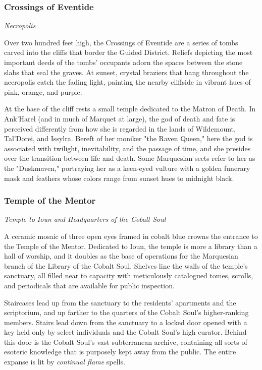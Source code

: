 \documentclass[10pt,a4paper,twoside,bg=print,twocolumn,openany,nodeprecatedcode]{dndbook}
\begin{document}
\subsubsection{Crossings of Eventide}
\textit{Necropolis}

Over two hundred feet high, the Crossings of Eventide are a series of tombs carved into the cliffs that border the Guided District. Reliefs depicting the most important deeds of the tombs' occupants adorn the spaces between the stone slabs that seal the graves. At sunset, crystal braziers that hang throughout the necropolis catch the fading light, painting the nearby cliffside in vibrant hues of pink, orange, and purple.

At the base of the cliff rests a small temple dedicated to the Matron of Death. In Ank'Harel (and in much of Marquet at large), the god of death and fate is perceived differently from how she is regarded in the lands of Wildemount, Tal'Dorei, and Issylra. Bereft of her moniker "the Raven Queen," here the god is associated with twilight, inevitability, and the passage of time, and she presides over the transition between life and death. Some Marquesian sects refer to her as the "Duskmaven," portraying her as a keen-eyed vulture with a golden funerary mask and feathers whose colors range from sunset hues to midnight black.

\subsubsection{Temple of the Mentor}
\textit{Temple to Ioun and Headquarters of the Cobalt Soul}

A ceramic mosaic of three open eyes framed in cobalt blue crowns the entrance to the Temple of the Mentor. Dedicated to Ioun, the temple is more a library than a hall of worship, and it doubles as the base of operations for the Marquesian branch of the Library of the Cobalt Soul. Shelves line the walls of the temple's sanctuary, all filled near to capacity with meticulously catalogued tomes, scrolls, and periodicals that are available for public inspection.

Staircases lead up from the sanctuary to the residents' apartments and the scriptorium, and up farther to the quarters of the Cobalt Soul's higher-ranking members. Stairs lead down from the sanctuary to a locked door opened with a key held only by select individuals and the Cobalt Soul's high curator. Behind this door is the Cobalt Soul's vast subterranean archive, containing all sorts of esoteric knowledge that is purposely kept away from the public. The entire expanse is lit by \textit{continual flame} spells.
\end{document}
